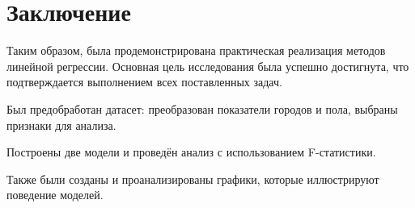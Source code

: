 \chapter{Заключение}
Таким образом, была продемонстрирована практическая реализация методов линейной регрессии. Основная цель исследования была успешно достигнута, что подтверждается выполнением всех поставленных задач.

Был предобработан датасет: преобразован показатели городов и пола, выбраны признаки для анализа.

Построены две модели и проведён анализ с использованием F-статистики.

Также были созданы и проанализированы графики, которые иллюстрируют поведение моделей.